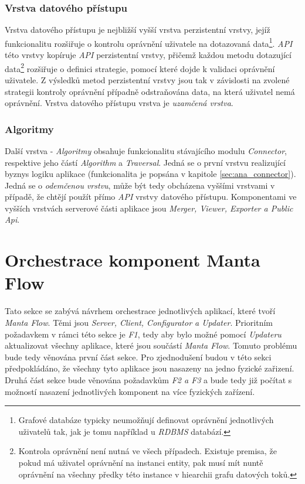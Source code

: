 \subsubsection{Vrstva datového přístupu}
\label{sec:des_data_access}
Vrstva datového přístupu je nejbližší vyšší vrstva perzistentní vrstvy, jejíž funkcionalitu rozšiřuje o kontrolu oprávnění uživatele na dotazovaná data\footnote{Grafové databáze typicky neumožňují definovat oprávnění jednotlivých uživatelů tak, jak je tomu například u \textit{RDBMS} databází.}. \textit{API} této vrstvy kopíruje \textit{API} perzistentní vrstvy, přičemž každou metodu dotazující data\footnote{Kontrola oprávnění není nutná ve všech případech. Existuje premisa, že pokud má uživatel oprávnění na instanci entity, pak musí mít nuntě oprávnění na všechny předky této instance v hiearchii grafu datových toků.} rozšiřuje o definici strategie, pomocí které dojde k validaci oprávnění uživatele. Z výsledků metod perzistentní vrstvy jsou tak v závislosti na zvolené strategii kontroly oprávnění případně odstraňována data, na která uživatel nemá oprávnění. Vrstva datového přístupu vrstva je \textit{uzamčená vrstva}.

\subsubsection{Algoritmy}
Další vrstva - \textit{Algoritmy} obsahuje funkcionalitu stávajícího modulu \textit{Connector}, respektive jeho částí \textit{Algorithm} a \textit{Traversal}. Jedná se o první vrstvu realizující byznys logiku aplikace (funkcionalita je popsána v kapitole \ref{sec:ana_connector}). Jedná se o \textit{odemčenou vrstvu}, může být tedy obcházena vyššími vrstvami v případě, že chtějí použít přímo \textit{API} vrstvy datového přístupu. Komponentami ve vyšších vrstvách serverové části aplikace jsou \textit{Merger, Viewer, Exporter a Public Api}.


\section{Orchestrace komponent Manta Flow}
\label{sec:des_orchestration}
Tato sekce se zabývá návrhem orchestrace jednotlivých aplikací, které tvoří \textit{Manta Flow}. Těmi jsou \textit{Server, Client, Configurator a Updater}. Prioritním požadavkem v rámci této sekce je \textit{F1}, tedy aby bylo možné pomocí \textit{Updateru} aktualizovat všechny aplikace, které jsou součástí \textit{Manta Flow}. Tomuto problému bude tedy věnována první část sekce. Pro zjednodušení budou v této sekci předpokládáno, že všechny tyto aplikace jsou nasazeny na jedno fyzické zařizení. Druhá část sekce bude věnována požadavkům \textit{F2 a F3} a bude tedy již počítat s možností nasazení jednotlivých komponent na více fyzických zařízení.

